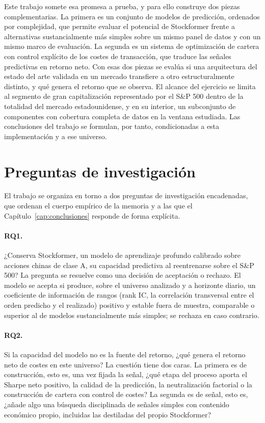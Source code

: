 Este trabajo somete esa promesa a prueba, y para ello construye dos piezas
complementarias. La primera es un conjunto de modelos de predicción, ordenados por
complejidad, que permite evaluar el potencial de Stockformer frente a alternativas
sustancialmente más simples sobre un mismo panel de datos y con un mismo marco de
evaluación. La segunda es un sistema de optimización de cartera con control explícito de
los costes de transacción, que traduce las señales predictivas en retorno neto. Con esas
dos piezas se evalúa si una arquitectura del estado del arte validada en un mercado
transfiere a otro estructuralmente distinto, y qué genera el retorno que se observa. El
alcance del ejercicio se limita al segmento de gran capitalización
representado por el S\&P 500 \autocite{spdji2025methodology} dentro de la totalidad del mercado estadounidense, y en su interior, un
subconjunto de componentes con cobertura completa de datos en la ventana estudiada. Las
conclusiones del trabajo se formulan, por tanto, condicionadas a esta implementación y a
ese universo. 


\section{Preguntas de investigación}

El trabajo se organiza en torno a dos preguntas de investigación encadenadas, que ordenan
el cuerpo empírico de la memoria y a las que el Capítulo~\ref{cap:conclusiones} responde
de forma explícita.

\paragraph{RQ1.} ¿Conserva Stockformer, un modelo de aprendizaje profundo calibrado sobre
acciones chinas de clase A, su capacidad predictiva al reentrenarse sobre el S\&P 500? La
pregunta se resuelve como una decisión de aceptación o rechazo. El modelo se acepta si
produce, sobre el universo analizado y a horizonte diario, un coeficiente de información
de rangos (rank IC, la correlación transversal entre el orden predicho y el realizado)
positivo y estable fuera de muestra, comparable o superior al de modelos sustancialmente
más simples; se rechaza en caso contrario.

\paragraph{RQ2.} Si la capacidad del modelo no es la fuente del retorno, ¿qué genera el
retorno neto de costes en este universo? La cuestión tiene dos caras. La primera es de
construcción, esto es, una vez fijada la señal, ¿qué etapa del proceso aporta el Sharpe neto
positivo, la calidad de la predicción, la neutralización factorial o la construcción de
cartera con control de costes? La segunda es de señal, esto es, ¿añade algo una búsqueda
disciplinada de señales simples con contenido económico propio, incluidas las destiladas
del propio Stockformer? 

